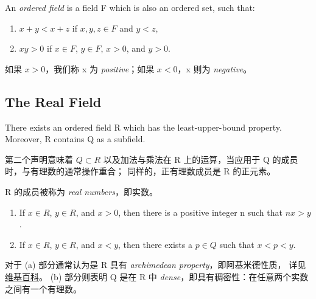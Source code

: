 \documentclass[../poma-note.tex]{subfiles}
\begin{document}
\setcounter{definition}{16}
\begin{definition}
	An \textit{ordered field} is a field F which is also an ordered set, such that:

	\begin{enumerate}
		\item $x+y<x+z$ if $x,y,z \in F$ and $y<z$,
		\item $xy>0$ if $x \in F$, $y \in F$, $x>0$, and $y>0$.
	\end{enumerate}
\end{definition}

如果 $x>0$，我们称 x 为 \textit{positive}；如果 $x<0$，x 则为 \textit{negative}。

\subsection*{The Real Field}

\setcounter{theorem}{18}
\begin{theorem}
	There exists an ordered field R which has the least-upper-bound property.
	Moreover, R contains Q as a subfield.
\end{theorem}

第二个声明意味着 $Q \subset R$ 以及加法与乘法在 R 上的运算，当应用于 Q 的成员时，与有理数的通常操作重合；
同样的，正有理数成员是 R 的正元素。

R 的成员被称为 \textit{real numbers}，即实数。


\begin{theorem}
	\leavevmode
	\begin{enumerate}[label=(\alph*)]
		\item If $x \in R$, $y \in R$, and $x>0$, then there is a positive integer n such that $nx>y$.
		\item If $x \in R$, $y \in R$, and $x<y$, then there exists a $p \in Q$ such that $x<p<y$.
	\end{enumerate}
\end{theorem}

对于 (a) 部分通常认为是 R 具有 \textit{archimedean property}，即阿基米德性质，
详见\href{https://en.wikipedia.org/wiki/Archimedean_property}{维基百科}。
(b) 部分则表明 Q 是在 R 中 \textit{dense}，即具有稠密性：在任意两个实数之间有一个有理数。
\end{document}
